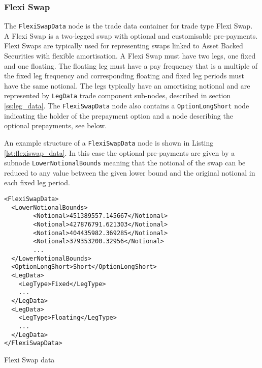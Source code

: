 \subsubsection{Flexi Swap}

\ifdefined{}\fi

The \lstinline!FlexiSwapData! node is the trade data container for trade type Flexi Swap. A Flexi Swap is a two-legged
swap with optional and customisable pre-payments. Flexi Swaps are typically used for representing swaps linked to Asset
Backed Securities with flexible amortisation. A Flexi Swap must have two legs, one fixed and one floating. The floating
leg must have a pay frequency that is a multiple of the fixed leg frequency and corresponding floating and fixed leg
periods must have the same notional. The legs typically have an amortising notional and are represented by
\lstinline!LegData! trade component sub-nodes, described in section \ref{ss:leg_data}. The \lstinline!FlexiSwapData!
node also contains a \lstinline!OptionLongShort! node indicating the holder of the prepayment option and a node
describing the optional prepayments, see below.

An example structure of a \lstinline!FlexiSwapData! node is shown in Listing \ref{lst:flexiswap_data}. In this case the
optional pre-payments are given by a subnode \lstinline!LowerNotionalBounds!  meaning that the notional of the swap can
be reduced to any value between the given lower bound and the original notional in each fixed leg period.

\begin{listing}[H]
\begin{verbatim}
<FlexiSwapData>
  <LowerNotionalBounds>
        <Notional>451389557.145667</Notional>
        <Notional>427876791.621303</Notional>
        <Notional>404435982.369285</Notional>
        <Notional>379353200.32956</Notional>
        ...
  </LowerNotionalBounds>
  <OptionLongShort>Short</OptionLongShort>
  <LegData>
    <LegType>Fixed</LegType>
    ...
  </LegData>
  <LegData>
    <LegType>Floating</LegType>
    ...
  </LegData>
</FlexiSwapData>
\end{verbatim}
\caption{Flexi Swap data}
\label{lst:flexiswap_data}
\end{listing}


